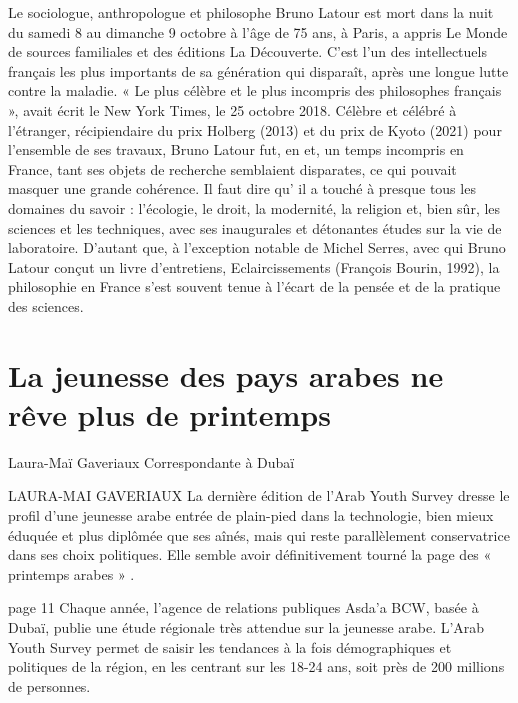 Le sociologue, anthropologue et philosophe Bruno Latour est mort dans la nuit du samedi 8 au dimanche 9 octobre à l’âge de 75 ans, à Paris, a appris Le Monde de sources familiales et des éditions La Découverte. C’est l’un des intellectuels français les plus importants de sa génération qui disparaît, après une longue lutte contre la maladie. « Le plus célèbre et le plus incompris des philosophes français », avait écrit le New York Times, le 25 octobre 2018. Célèbre et célébré à l’étranger, récipiendaire du prix Holberg (2013) et du prix de Kyoto (2021) pour l’ensemble de ses travaux, Bruno Latour fut, en et, un temps incompris en France, tant ses objets de recherche semblaient disparates, ce qui pouvait masquer une grande cohérence. Il faut dire qu’ il a  touché à presque tous les domaines du savoir : l’écologie, le droit, la modernité, la religion et, bien sûr, les sciences et les techniques, avec ses inaugurales et détonantes études sur la vie de laboratoire. D’autant que, à l’exception notable de Michel Serres, avec qui Bruno Latour conçut un livre d’entretiens, Eclaircissements (François Bourin, 1992), la philosophie en France s’est souvent tenue à l’écart de la pensée et de la pratique des sciences. 

\section{La jeunesse des pays arabes ne rêve plus de printemps}



Laura-Maï Gaveriaux Correspondante à Dubaï

LAURA-MAI GAVERIAUX
La dernière édition de l'Arab Youth Survey dresse le profil d'une jeunesse arabe entrée de plain-pied dans la technologie, bien mieux éduquée et plus diplômée que ses aînés, mais qui reste parallèlement conservatrice dans ses choix politiques. Elle semble avoir définitivement tourné la page des « printemps arabes » .

page 11
Chaque année, l'agence de relations publiques Asda'a BCW, basée à Dubaï, publie une étude régionale très attendue sur la jeunesse arabe. L'Arab Youth Survey permet de saisir les tendances à la fois démographiques et politiques de la région, en les centrant sur les 18-24 ans, soit près de 200 millions de personnes.

